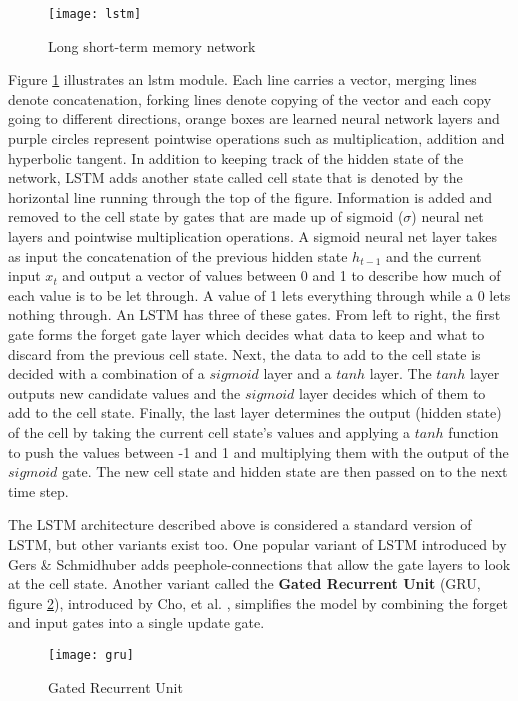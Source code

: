 \begin{figure}[t]
\texttt{[image: lstm]}
\centering
\caption{Long short-term memory network}
\label{fig:lstm}
\end{figure}

Figure \ref{fig:lstm} illustrates an lstm module. Each line carries a vector, merging lines denote concatenation, forking lines denote copying of the vector and each copy going to different directions, orange boxes are learned neural network layers and purple circles represent pointwise operations such as multiplication, addition and hyperbolic tangent.
In addition to keeping track of the hidden state of the network, LSTM adds another state called cell state that is denoted by the horizontal line running through the top of the figure.
Information is added and removed to the cell state by gates that are made up of sigmoid ($\sigma$) neural net layers and pointwise multiplication operations.
A sigmoid neural net layer takes as input the concatenation of the previous hidden state $h_{t-1}$ and the current input $x_t$ and output a vector of values between 0 and 1 to describe how much of each value is to be let through.
A value of 1 lets everything through while a 0 lets nothing through.
An LSTM has three of these gates.
From left to right, the first gate forms the forget gate layer which decides what data to keep and what to discard from the previous cell state.
Next, the data to add to the cell state is decided with a combination of a $sigmoid$ layer and a $tanh$ layer. The $tanh$ layer outputs new candidate values and the $sigmoid$ layer decides which of them to add to the cell state.
Finally, the last layer determines the output (hidden state) of the cell by taking the current cell state's values and applying a $tanh$ function to push the values between -1 and 1 and multiplying them with the output of the $sigmoid$ gate.
The new cell state and hidden state are then passed on to the next time step.

The LSTM architecture described above is considered a standard version of LSTM, but other variants exist too.
One popular variant of LSTM introduced by Gers \& Schmidhuber \cite{gers2000a} adds peephole-connections that allow the gate layers to look at the cell state.
Another variant called the \textbf{Gated Recurrent Unit} (GRU, figure \ref{fig:gru}), introduced by Cho, et al. \cite{cho2014}, simplifies the model by combining the forget and input gates into a single update gate.

\begin{figure}[t]
\texttt{[image: gru]}
\centering
\caption{Gated Recurrent Unit}
\label{fig:gru}
\end{figure}

